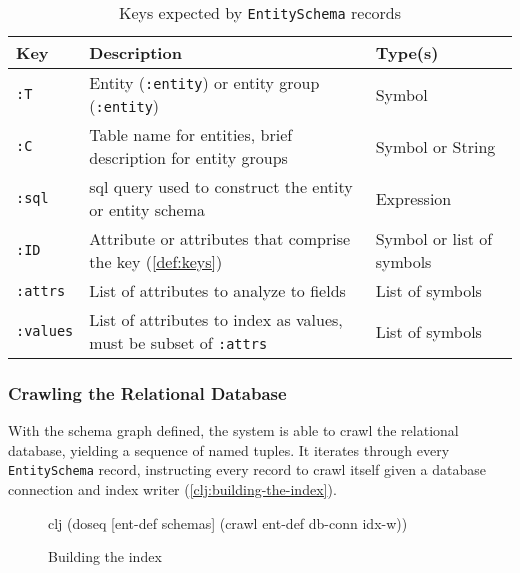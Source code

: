 			\begin{table}[H]
				\centering
				
				\begin{tabular}{lp{9cm}l}
					\toprule
					Key & Description & Type(s) \\
					\midrule
					\texttt{:T} & Entity (\texttt{:entity}) or entity group (\texttt{:entity}) & Symbol \\
					\texttt{:C} & Table name for entities, brief description for entity groups & Symbol or String \\
					\texttt{:sql} & \Gls{sql} query used to construct the entity or entity schema & Expression \\
					\texttt{:ID} & Attribute or attributes that comprise the key (\vref{def:keys}) & Symbol or list of symbols \\
					\texttt{:attrs} & List of attributes to analyze to fields & List of symbols \\
					\texttt{:values} & List of attributes to index as values, must be subset of \texttt{:attrs} & List of symbols \\
					\bottomrule
				\end{tabular}
				
				\caption{Keys expected by \texttt{EntitySchema} records}
				\label{tbl:entity-schema-keys}
			\end{table}
		
		\subsubsection{Crawling the Relational Database}
			With the schema graph defined, the system is able to crawl the relational database, yielding a sequence of named tuples.  It iterates through every \texttt{EntitySchema} record, instructing every record to crawl itself given a database connection and index writer (\vref{clj:building-the-index}).
			
			\begin{figure}[H]
				\begin{singlespaced}
					\begin{pygments}{clj}
(doseq [ent-def schemas]
  (crawl ent-def db-conn idx-w))
					\end{pygments}
				\end{singlespaced}
				
				\caption{Building the index}
				\label{clj:building-the-index}
			\end{figure}
			

